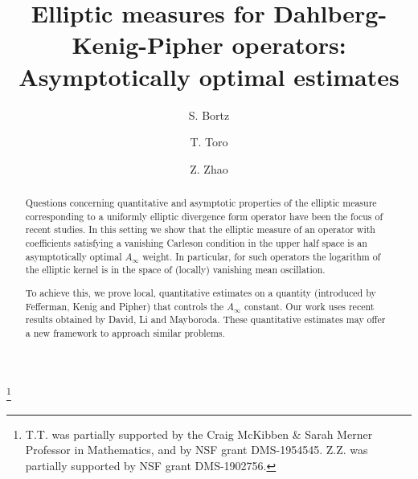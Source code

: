 \documentclass[11pt, a4paper,leqno]{amsart}
\theoremstyle{plain}
\theoremstyle{definition}
\theoremstyle{remark}
\numberwithin{equation}{section}
\begin{document}
\allowdisplaybreaks

\author{S. Bortz}
\address{Department of Mathematics, University of Alabama, Tuscaloosa, AL, 35487, USA}


\author{T. Toro}
\address{Department of Mathematics, University of Washington, Seattle, WA
98195, USA}

\author{Z. Zhao}
\address{Department of Mathematics, University of Chicago, Chicago, IL 60637, USA}


\title[Elliptic measures for DKP operators]{Elliptic measures for Dahlberg-Kenig-Pipher operators: Asymptotically optimal estimates}

\begin{abstract}
Questions concerning quantitative and asymptotic properties of the elliptic measure corresponding to a uniformly elliptic divergence form operator have been the focus of recent studies.
In this setting we show that the elliptic measure of an operator with coefficients satisfying a vanishing Carleson condition in the upper half space is an asymptotically optimal $A_\infty$ weight. In particular, for such operators the logarithm of the elliptic kernel is in the space of (locally) vanishing mean oscillation. 

To achieve this, we prove local, quantitative estimates on a quantity (introduced by Fefferman, Kenig and Pipher) that controls the $A_\infty$ constant. Our work uses recent results obtained by David, Li and Mayboroda. These quantitative estimates may offer a new framework to approach similar problems.
\end{abstract}

\thanks{T.T. was partially supported by the Craig McKibben \& Sarah Merner Professor in Mathematics, and by NSF grant DMS-1954545. Z.Z. was partially supported by NSF grant DMS-1902756.}




\maketitle
\tableofcontents
\end{document}

